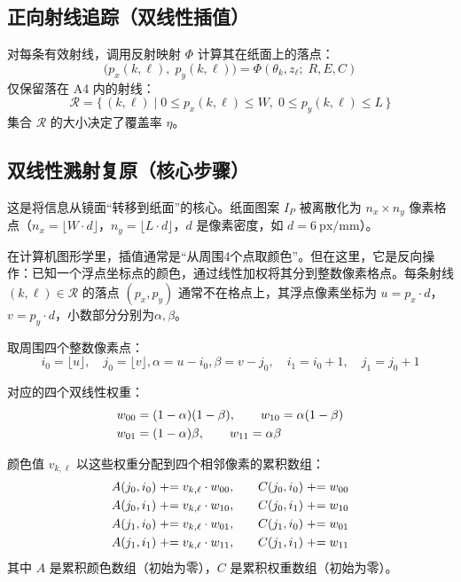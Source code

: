 \documentclass[12pt,a4paper]{ctexart}
\begin{document}
\subsection{正向射线追踪（双线性插值）}

对每条有效射线，调用反射映射 $\Phi$ 计算其在纸面上的落点：
\begin{equation}
    \bigl(p_x(k,\ell),\; p_y(k,\ell)\bigr) = \Phi(\theta_k, z_\ell;\; R, E, C)
\end{equation}
仅保留落在 A4 内的射线：
\begin{equation}
    \mathcal{R} = \{\, (k,\ell) \mid 0\le p_x(k,\ell)\le W,\; 0\le p_y(k,\ell)\le L \,\}
\end{equation}
集合 $\mathcal{R}$ 的大小决定了覆盖率 $\eta$。

\subsection{双线性溅射复原（核心步骤）}

这是将信息从镜面``转移到纸面''的核心。纸面图案 $I_P$ 被离散化为 $n_x\times n_y$ 像素格点（$n_x=\lfloor W\cdot d\rfloor$，$n_y=\lfloor L\cdot d\rfloor$，$d$ 是像素密度，如 $d=6\ \mathrm{px/mm}$）。

在计算机图形学里，插值通常是“从周围4个点取颜色”。但在这里，它是反向操作：已知一个浮点坐标点的颜色，通过线性加权将其分到整数像素格点。每条射线 $(k,\ell)\in\mathcal{R}$ 的落点 $(p_x,p_y)$ 通常不在格点上，其浮点像素坐标为 $u=p_x\cdot d$，$v=p_y\cdot d$，小数部分分别为$\alpha,\beta$。

取周围四个整数像素点：
\begin{equation}
    i_0=\lfloor u\rfloor,\quad j_0=\lfloor v\rfloor,\alpha = u - i_0,\beta = v - j_0,\quad i_1=i_0+1,\quad j_1=j_0+1
\end{equation}

对应的四个双线性权重：
\begin{align}
    w_{00} &= (1-\alpha)(1-\beta),\qquad w_{10} = \alpha(1-\beta) \notag\\
    w_{01} &= (1-\alpha)\beta,\qquad w_{11} = \alpha\beta
\end{align}

颜色值 $v_{k,\ell}$ 以这些权重分配到四个相邻像素的累积数组：
\begin{align}
    A(j_0,i_0) &\mathrel{+}= v_{k,\ell}\cdot w_{00}, &\quad C(j_0,i_0) &\mathrel{+}= w_{00} \notag\\
    A(j_0,i_1) &\mathrel{+}= v_{k,\ell}\cdot w_{10}, &\quad C(j_0,i_1) &\mathrel{+}= w_{10} \notag\\
    A(j_1,i_0) &\mathrel{+}= v_{k,\ell}\cdot w_{01}, &\quad C(j_1,i_0) &\mathrel{+}= w_{01} \notag\\
    A(j_1,i_1) &\mathrel{+}= v_{k,\ell}\cdot w_{11}, &\quad C(j_1,i_1) &\mathrel{+}= w_{11}
\end{align}
其中 $A$ 是累积颜色数组（初始为零），$C$ 是累积权重数组（初始为零）。
\end{document}
